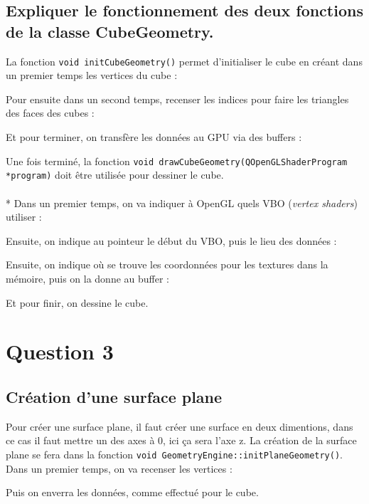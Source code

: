 \documentclass[a4paper,11pt]{report}
\begin{document}
	\subsection{Expliquer le fonctionnement des deux fonctions de la classe CubeGeometry.}
	    La fonction {\lstinline{void initCubeGeometry()}} permet d'initialiser le cube en créant dans un premier temps les vertices du cube :
    
    Pour ensuite dans un second temps, recenser les indices pour faire les triangles des faces des cubes :
    
    \pagebreak
    
    Et pour terminer, on transfère les données au GPU via des buffers :
    
    Une fois terminé, la fonction {\lstinline{void drawCubeGeometry(QOpenGLShaderProgram *program)}} doit être utilisée pour dessiner le cube.\\ \\*
    Dans un premier temps, on va indiquer à OpenGL quels VBO ({\it{vertex shaders}}) utiliser :
    
    Ensuite, on indique au pointeur le début du VBO, puis le lieu des données :
    
    \pagebreak
    
    Ensuite, on indique où se trouve les coordonnées pour les textures dans la mémoire, puis on la donne au buffer :
    
    
    Et pour finir, on dessine le cube.
    
	
	\pagebreak
	\section{Question 3}
	\subsection{Création d'une surface plane}
	  Pour créer une surface plane, il faut créer une surface en deux dimentions, dans ce cas il faut mettre un des axes à 0, ici ça sera l'axe z. La création de la surface plane se fera dans la fonction \lstinline{void GeometryEngine::initPlaneGeometry()}. Dans un premier temps, on va recenser les vertices :
	  
	  Puis on enverra les données, comme effectué pour le cube.
	  \pagebreak
	  
\end{document}
